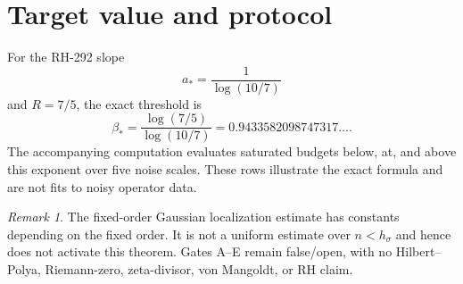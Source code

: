 \documentclass[11pt]{article}
\theoremstyle{remark}\newtheorem{remark}[theorem]{Remark}
\begin{document}
\section{Target value and protocol}
For the RH-292 slope
\[
 a_*=\frac1{\log(10/7)}
\]
and $R=7/5$, the exact threshold is
\[
 \beta_*=\frac{\log(7/5)}{\log(10/7)}
 =0.9433582098747317\ldots.
\]
The accompanying computation evaluates saturated budgets below, at, and
above this exponent over five noise scales.  These rows illustrate the exact
formula and are not fits to noisy operator data.

\begin{remark}
The fixed-order Gaussian localization estimate has constants depending on
the fixed order.  It is not a uniform estimate over $n<h_\sigma$ and hence
does not activate this theorem.  Gates A--E remain false/open, with no
Hilbert--Polya, Riemann-zero, zeta-divisor, von Mangoldt, or RH claim.
\end{remark}
\end{document}
